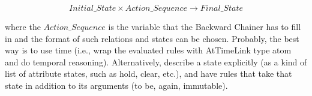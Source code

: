 \begin{enumerate}
\begin{equation}
Initial\_State \times Action\_Sequence \rightarrow Final\_State 
\end{equation}

where the $Action\_Sequence$ is the variable that the Backward Chainer has to fill in and the format of such relations and states can be chosen. 
Probably, the best way is to use time (i.e., wrap the evaluated rules with AtTimeLink type atom and do temporal reasoning). 
Alternatively, describe a state explicitly (as a kind of list of attribute states, such as hold, clear, etc.), and have rules that take that state in addition to its arguments (to be, again, immutable).

\end{enumerate}